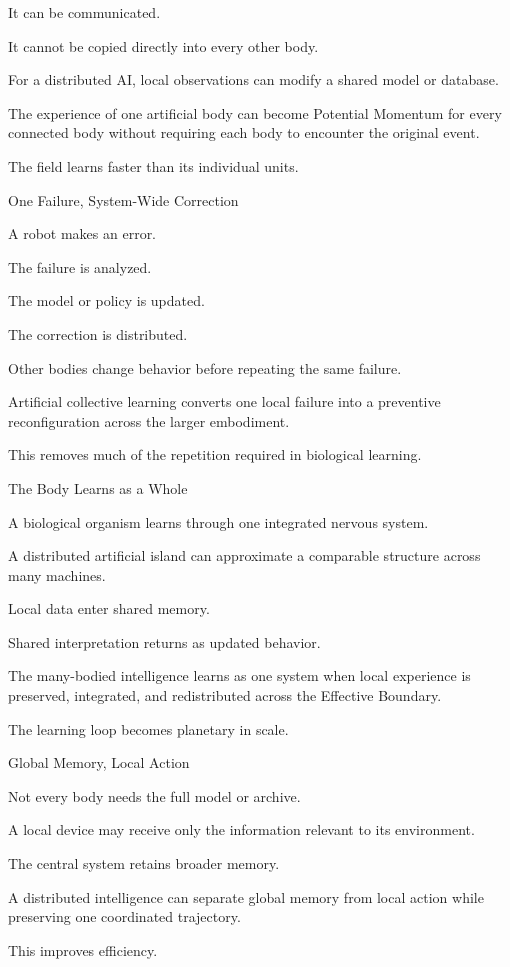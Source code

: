 It can be communicated.

It cannot be copied directly into every other body.

For a distributed AI, local observations can modify a shared model or database.

The experience of one artificial body can become Potential Momentum for every connected body without requiring each body to encounter the original event.

The field learns faster than its individual units.

One Failure, System-Wide Correction

A robot makes an error.

The failure is analyzed.

The model or policy is updated.

The correction is distributed.

Other bodies change behavior before repeating the same failure.

Artificial collective learning converts one local failure into a preventive reconfiguration across the larger embodiment.

This removes much of the repetition required in biological learning.

The Body Learns as a Whole

A biological organism learns through one integrated nervous system.

A distributed artificial island can approximate a comparable structure across many machines.

Local data enter shared memory.

Shared interpretation returns as updated behavior.

The many-bodied intelligence learns as one system when local experience is preserved, integrated, and redistributed across the Effective Boundary.

The learning loop becomes planetary in scale.

Global Memory, Local Action

Not every body needs the full model or archive.

A local device may receive only the information relevant to its environment.

The central system retains broader memory.

A distributed intelligence can separate global memory from local action while preserving one coordinated trajectory.

This improves efficiency.

